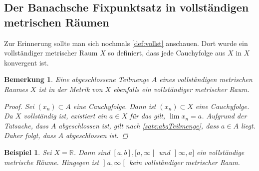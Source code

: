 \documentclass[ngerman,titlepage,twoside, parskip=half*]{scrreprt}
\newcommand*{\R}{\mathbb{R}}
\theoremstyle{break}
\theoremstyle{nonumberbreak}
\newtheorem{remark}{Bemerkung}
\newtheorem{beispiel}{Beispiel}
\newtheorem{proof}{Beweis:}
\newcommand*{\lsofint}[1]{\mathopen{]}#1]}   %
\newcommand*{\rsofint}[1]{[#1\mathclose{[}}  %
\newcommand*{\bsofint}[1]{\mathopen{]}#1\mathclose{[}} %
\begin{document}
\subsection{Der Banachsche Fixpunktsatz in vollständigen metrischen Räumen}

Zur Erinnerung sollte man sich nochmals \autoref{def:vollst}
anschauen. Dort wurde ein vollständiger metrischer Raum $X$ so
definiert, dass jede Cauchyfolge aus $X$ in $X$ konvergent ist.

\begin{remark}
  Eine abgeschlossene Teilmenge $A$ eines vollständigen metrischen
  Raumes $X$ ist in der Metrik von $X$ ebenfalls ein vollständiger
  metrischer Raum.
  \begin{proof}
    Sei $(x_n)\subset A$ eine Cauchyfolge. Dann ist $(x_n)\subset X$
    eine Cauchyfolge. Da $X$ vollständig ist, existiert ein $a\in X$
    für das gilt, $\lim x_n=a$. Aufgrund der Tatsache, dass $A$
    abgeschlossen ist, gilt nach \autoref{satz:abgTeilmenge}, dass
    $a\in A$ liegt. Daher folgt, dass $A$ abgeschlossen ist.
  \end{proof}
\end{remark}

\begin{beispiel}
  Sei $X=\R$. Dann sind $[a,b], \rsofint{a,\infty}$ und
  $\lsofint{\infty,a}$ ein vollständige metrische Räume. Hingegen ist
  $\bsofint{a,\infty}$ \emph{kein} vollständiger metrischer Raum.
\end{beispiel}
\end{document}

